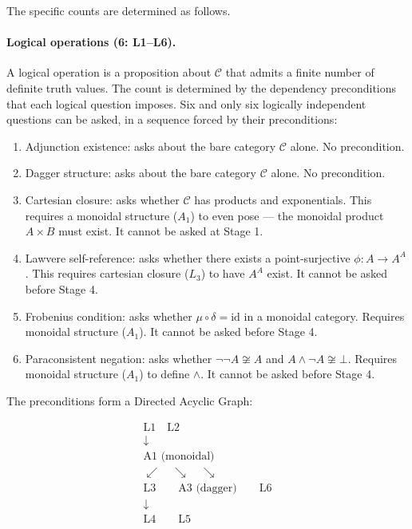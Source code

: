 \documentclass[12pt,a4paper]{article}
\begin{document}
The specific counts are determined as follows.

\paragraph{Logical operations (6: L1--L6).}
A logical operation is a proposition about $\mathcal{C}$ that admits a finite number of definite truth values. The count is determined by the dependency preconditions that each logical question imposes. Six and only six logically independent questions can be asked, in a sequence forced by their preconditions:

\begin{enumerate}[nosep, leftmargin=2em]
  \item[\textbf{L1}] Adjunction existence: asks about the bare category $\mathcal{C}$ alone. No precondition.
  \item[\textbf{L2}] Dagger structure: asks about the bare category $\mathcal{C}$ alone. No precondition.
  \item[\textbf{L3}] Cartesian closure: asks whether $\mathcal{C}$ has products and exponentials. This requires a monoidal structure ($A_1$) to even pose --- the monoidal product $A \times B$ must exist. It cannot be asked at Stage 1.
  \item[\textbf{L4}] Lawvere self-reference: asks whether there exists a point-surjective $\phi: A \to A^A$. This requires cartesian closure ($L_3$) to have $A^A$ exist. It cannot be asked before Stage 4.
  \item[\textbf{L5}] Frobenius condition: asks whether $\mu\circ\delta = \text{id}$ in a monoidal category. Requires monoidal structure ($A_1$). It cannot be asked before Stage 4.
  \item[\textbf{L6}] Paraconsistent negation: asks whether $\neg\neg A \not\cong A$ and $A \wedge \neg A \not\cong \bot$. Requires monoidal structure ($A_1$) to define $\wedge$. It cannot be asked before Stage 4.
\end{enumerate}

The preconditions form a Directed Acyclic Graph:

\[
\begin{array}{c}
\text{L1} \quad \text{L2} \\
\downarrow \\
\text{A1 (monoidal)} \\
\swarrow \quad \searrow \quad \searrow \\
\text{L3} \qquad \text{A3 (dagger)} \qquad \text{L6} \\
\downarrow \\
\text{L4} \qquad \text{L5}
\end{array}
\]
\end{document}
